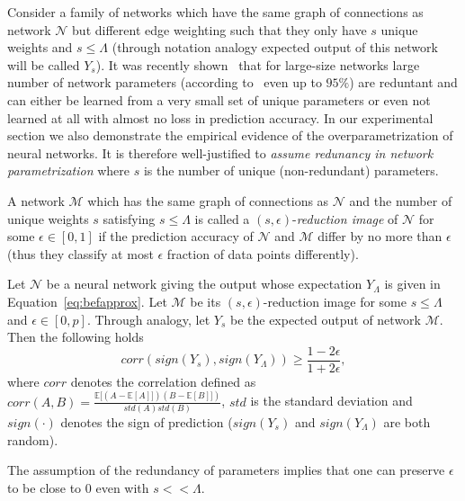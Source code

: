 \documentclass[twoside]{article}
\begin{document}
Consider a family of networks which have the same graph of connections as network $\mathcal{N}$ but different edge weighting such that they only have $s$ unique weights and $s \leq \Lambda$ (through notation analogy expected output of this network will be called $Y_s$). It was recently shown~\cite{NIPS2013_5025,DBLP:journals/corr/DentonZBLF14} that for large-size networks large number of network parameters (according to~\cite{NIPS2013_5025} even up to $95\%$) are reduntant and can either be learned from a very small set of unique parameters or even not learned at all with almost no loss in prediction accuracy.  In our experimental section we also demonstrate the empirical evidence of the overparametrization of neural networks. It is therefore well-justified to \textit{assume redunancy in network parametrization} where $s$ is the number of unique (non-redundant) parameters.

\begin{definition}
A network $\mathcal{M}$ which has the same graph of connections as $\mathcal{N}$ and the number of unique weights $s$ satisfying $s \leq \Lambda$ is called a $(s,\epsilon)$-\textit{reduction image} of $\mathcal{N}$ for some $\epsilon \in [0,1]$ if the prediction accuracy of $\mathcal{N}$ and $\mathcal{M}$ differ by no more than $\epsilon$ (thus they classify at most $\epsilon$ fraction of data points differently).
\end{definition}

\begin{theorem}
Let $\mathcal{N}$ be a neural network giving the output whose expectation $Y_{\Lambda}$ is given in Equation~\ref{eq:befapprox}. Let $\mathcal{M}$ be its $(s,\epsilon)$-reduction image for some $s \leq \Lambda$ and $\epsilon \in [0,p]$. Through analogy, let $Y_s$ be the expected output of network $\mathcal{M}$. Then the following holds
\[corr(sign(Y_s),sign(Y_{\Lambda})) \geq \frac{1-2\epsilon}{1+2\epsilon},
\]
where $corr$ denotes the correlation defined as $corr(A,B) = \frac{\mathbb{E}[(A - \mathbb{E}[A]])(B - \mathbb{E}[B]])}{std(A)std(B)}$, $std$ is the standard deviation and $sign(\cdot)$ denotes the sign of prediction ($sign(Y_s)$ and $sign(Y_{\Lambda})$ are both random).
\label{thm:redun}
\end{theorem}

The assumption of the redundancy of parameters implies that one can preserve $\epsilon$ to be close to $0$ even with $s << \Lambda$.
\end{document}
